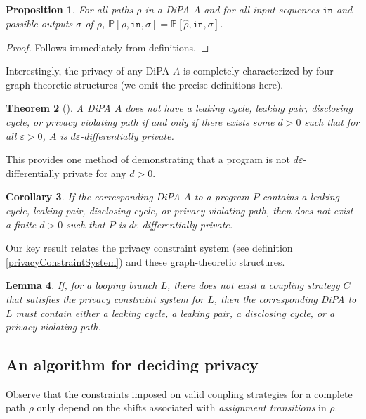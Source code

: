 \documentclass[12pt]{article}
\newcommand{\PP}{\mathbb{P}}
\newtheorem{thm}{Theorem}[section]
\newtheorem{lemma}[thm]{Lemma}
\newtheorem{prop}[thm]{Proposition}
\newtheorem{cor}[thm]{Corollary}
\theoremstyle{definition}
\begin{document}
\begin{prop}
    For all paths $\rho$ in a DiPA $A$ and for all input sequences $\texttt{in}$ and possible outputs $\sigma$ of $\rho$, $\PP[\rho, \texttt{in}, \sigma] = \PP[\hat{\rho}, \texttt{in}, \sigma]$.
\end{prop}
\begin{proof}
    Follows immediately from definitions. 
\end{proof}


Interestingly, the privacy of any DiPA $A$ is completely characterized by four graph-theoretic structures (we omit the precise definitions here). 

\begin{thm}[\cite{chadhaLinearTimeDecidability2021}]\label{DiPACounterexamplesThm}
    A DiPA $A$ does not have a leaking cycle, leaking pair, disclosing cycle, or privacy violating path if and only if there exists some $d>0$ such that for all $\varepsilon>0$, $A$ is $d\varepsilon$-differentially private. 
\end{thm}

This provides one method of demonstrating that a program is not $d\varepsilon$-differentially private for any $d>0$.

\begin{cor}
    If the corresponding DiPA $A$ to a program $P$ contains a leaking cycle, leaking pair, disclosing cycle, or privacy violating path, then does not exist a finite $d>0$ such that $P$ is $d\varepsilon$-differentially private. 
\end{cor}

Our key result relates the privacy constraint system (see definition \ref{privacyConstraintSystem}) and these graph-theoretic structures.

\begin{lemma}
    If, for a looping branch $L$, there does not exist a coupling strategy $C$ that satisfies the privacy constraint system for $L$, then the corresponding DiPA to $L$ must contain either a leaking cycle, a leaking pair, a disclosing cycle, or a privacy violating path. 
\end{lemma}

\subsection{An algorithm for deciding privacy}

Observe that the constraints imposed on valid coupling strategies for a complete path $\rho$ only depend on the shifts associated with \textit{assignment transitions} in $\rho$. 
\end{document}
